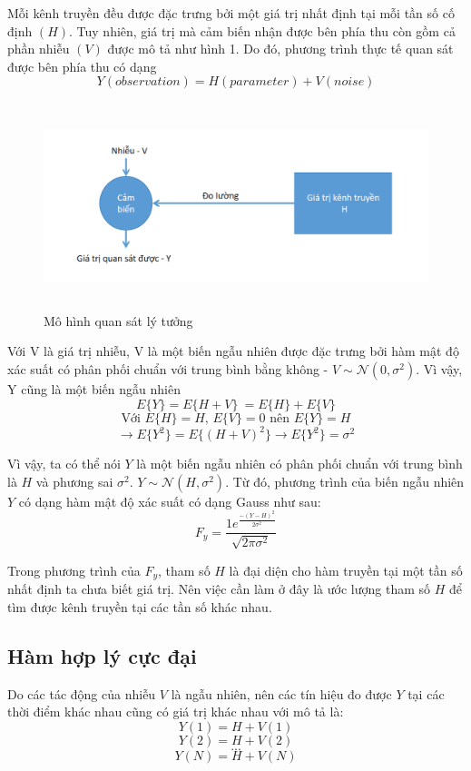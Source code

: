 \documentclass{article}
\begin{document}
Mỗi kênh truyền đều được đặc trưng bởi một giá trị nhất định tại mỗi tần số cố định $(H)$. Tuy nhiên, giá trị mà cảm biến nhận được bên phía thu còn gồm cả phần nhiễu $(V)$ được mô tả như hình 1. Do đó, phương trình thực tế quan sát được bên phía thu có dạng \\
$$Y (observation) = H (parameter) + V (noise)$$

\begin{figure}[h!]
    \centering
\includegraphics[width=15cm, height =6cm]{photo/3.1.1.png}
    \caption{Mô hình quan sát lý tưởng}
    \label{Hình 12}
\end{figure}

Với V là giá trị nhiễu, V là một biến ngẫu nhiên được đặc trưng bởi hàm mật độ xác suất có phân phối chuẩn với trung bình bằng không - $V \sim \mathcal{N}(0,\sigma^2)$. Vì vậy, Y cũng là một biến ngẫu nhiên\\
\[ E\{Y\} = E\{ H + V \}\ = E\{H\} + E\{V\}\]
$$ \text{Với } E\{H\} = H \text{, }  E\{V\} = 0 \text{ nên } E\{Y\} = H$$
\[\rightarrow E\{Y^2\} = E\{ (H + V)^2 \} \rightarrow E\{Y^2\} = \sigma^2 \] 

Vì vậy, ta có thể nói $Y$ là một biến ngẫu nhiên có phân phối chuẩn với trung bình là $H$ và phương sai $\sigma^2$. $Y \sim \mathcal{N}(H,\sigma^2)$. Từ đó, phương trình của biến ngẫu nhiên $Y$ có dạng hàm mật độ xác suất có dạng Gauss như sau:
$$F_y = \frac{1e^{\frac{-(Y-H)^2}{2\sigma^2}}}{\sqrt{2\pi\sigma^2}}$$

Trong phương trình của $F_y$, tham số $H$ là đại diện cho hàm truyền tại một tần số nhất định ta chưa biết giá trị. Nên việc cần làm ở đây là ước lượng tham số $H$ để tìm được kênh truyền tại các tần số khác nhau.

\subsection{Hàm hợp lý cực đại}
Do các tác động của nhiễu $V$ là ngẫu nhiên, nên các tín hiệu đo được $Y$ tại các thời điểm khác nhau cũng có giá trị khác nhau với mô tả là:
$$Y(1) = H + V(1)$$
$$Y(2) = H + V(2)$$
$$...$$
$$Y(N) = H + V(N)$$
\end{document}
